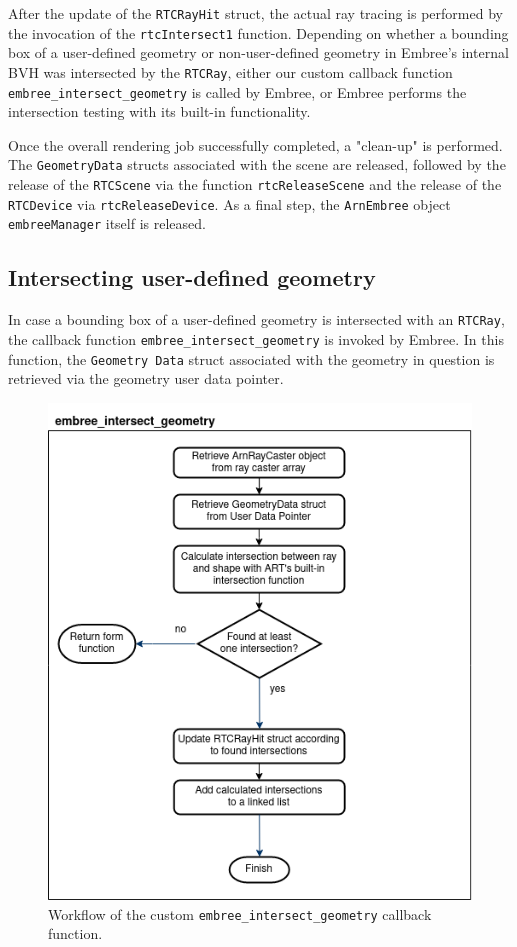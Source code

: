 After the update of the \texttt{RTCRayHit} struct, the actual ray tracing is performed by the invocation of the \texttt{rtcIntersect1} function. Depending on whether a bounding box of a user-defined geometry or non-user-defined geometry in Embree's internal BVH was intersected by the \texttt{RTCRay}, either our custom callback function \texttt{embree\_intersect\_geometry} is called by Embree, or Embree performs the intersection testing with its built-in functionality.

Once the overall rendering job successfully completed, a "clean-up" is performed. The \texttt{GeometryData} structs associated with the scene are released, followed by the release of the \texttt{RTCScene} via the function \texttt{rtcReleaseScene} and the release of the \texttt{RTCDevice} via \texttt{rtcReleaseDevice}. As a final step, the \texttt{ArnEmbree} object \texttt{embreeManager} itself is released.


\subsection{Intersecting user-defined geometry}
\label{subsec:instersect}

In case a bounding box of a user-defined geometry is intersected with an \texttt{RTCRay}, the callback function \texttt{embree\_intersect\_geometry} is invoked by Embree. In this function, the \texttt{Geometry Data} struct associated with the geometry in question is retrieved via the geometry user data pointer. 

\begin{figure} 
	\centering
	\includegraphics[width=.8\linewidth]{img/3 approach/inetsect_flowchart.png}
	\caption{Workflow of the custom \texttt{embree\_intersect\_geometry} callback function.}
	\label{fig:intersecting_chart}
\end{figure}

